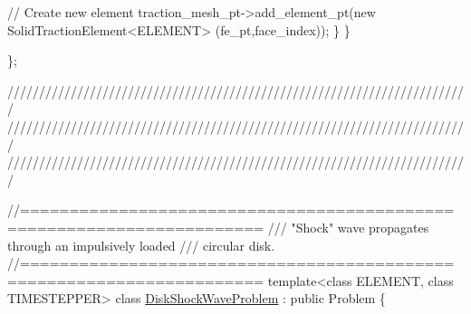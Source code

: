 \begin{DoxyCodeInclude}
     \textcolor{comment}{// Create new element}
     traction\_mesh\_pt->add\_element\_pt(\textcolor{keyword}{new} SolidTractionElement<ELEMENT>
                                      (fe\_pt,face\_index));
    \}
  \}


\};




\textcolor{comment}{}
\textcolor{comment}{/////////////////////////////////////////////////////////////////////////}
\textcolor{comment}{/////////////////////////////////////////////////////////////////////////}
\textcolor{comment}{/////////////////////////////////////////////////////////////////////////}
\textcolor{comment}{}


\textcolor{comment}{//====================================================================== }\textcolor{comment}{}
\textcolor{comment}{/// "Shock" wave propagates through an impulsively loaded}
\textcolor{comment}{/// circular disk.}
\textcolor{comment}{}\textcolor{comment}{//====================================================================== }
\textcolor{keyword}{template}<\textcolor{keyword}{class} ELEMENT, \textcolor{keyword}{class} TIMESTEPPER>
\textcolor{keyword}{class }\hyperlink{classDiskShockWaveProblem}{DiskShockWaveProblem} : \textcolor{keyword}{public} Problem
\{


\end{DoxyCodeInclude}
